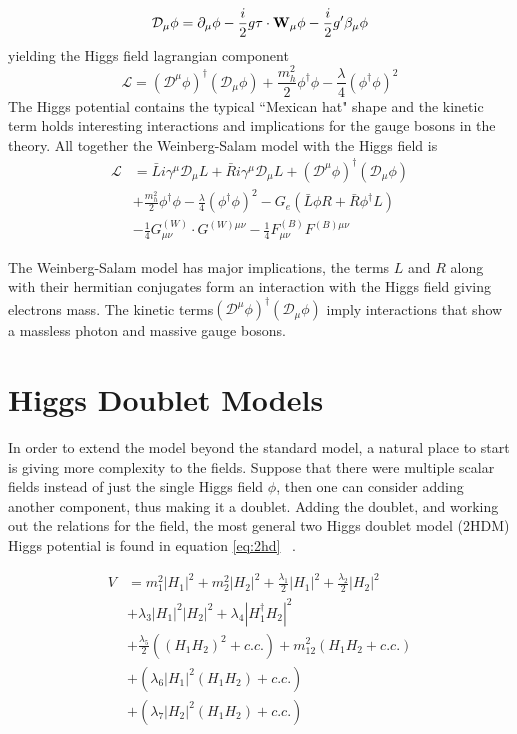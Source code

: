 \[\mathcal{D}_\mu \phi = \partial_\mu \phi - \frac{i}{2}g\bold{\tau}\cdot\bold{W}_\mu \phi - \frac{i}{2}g'\beta_\mu\phi \]
yielding the Higgs field lagrangian component 
\[\mathcal{L} = (\mathcal{D}^\mu \phi)^\dag (\mathcal{D}_\mu \phi) + \frac{m^2_h}{2}\phi^\dag \phi - \frac{\lambda}{4}(\phi^\dag\phi)^2 \] 
The Higgs potential contains the typical ``Mexican hat" shape and the kinetic term holds interesting interactions and implications for the gauge bosons in the theory. 
All together the Weinberg-Salam model with the Higgs field is ~\cite{Lancaster:1629337}
\begin{align}
\label{eq:ws}
\mathcal{L} &= \bar{L}i \gamma^\mu \mathcal{D}_\mu L +\bar{R}i \gamma^\mu \mathcal{D}_\mu L + (\mathcal{D}^\mu \phi)^\dag(\mathcal{D}_\mu\phi)  \\
            &+\frac{m^2_h}{2}\phi^\dag \phi - \frac{\lambda}{4}(\phi^\dag\phi)^2 - G_e(\bar{L}\phi R +\bar{R}\phi^\dag L)\nonumber \\
            &-\frac{1}{4}G^{(W)}_{\mu\nu}\cdot G^{(W)\mu\nu} - \frac{1}{4}F^{(B)}_{\mu\nu} F^{(B)\mu\nu} 
\end{align}

The Weinberg-Salam model has major implications, the terms $L$ and $R$ along with their hermitian conjugates form an interaction with the Higgs field giving electrons mass. The kinetic terms$(\mathcal{D}^\mu \phi)^\dag(\mathcal{D}_\mu\phi)$ imply interactions that show a massless photon and massive gauge bosons.  

\section{Higgs Doublet Models}
In order to extend the model beyond the standard model, a natural place to start is giving more complexity to the fields. Suppose that there were multiple scalar fields instead of just the single Higgs field $\phi$, then one can consider adding another component, thus making it a doublet. Adding the doublet, and working out the relations for the field, the most general two Higgs doublet model (2HDM) Higgs potential is found in equation \ref{eq:2hd} ~\cite{Branco_2012}.

\begin{align} 
\label{eq:2hd}
V &= m^2_1|H_1|^2 + m^2_2|H_2|^2 + \frac{\lambda_1}{2}|H_1|^2 + \frac{\lambda_2}{2}|H_2|^2  \\
    &+\lambda_3|H_1|^2|H_2|^2 + \lambda_4|H^\dag_1 H_2|^2 \nonumber \\
    &+\frac{\lambda_5}{2}\left((H_1H_2)^2 + c.c.\right) +m^2_{12}\left(H_1 H_2 + c.c.\right) \nonumber \\
    &+\left(\lambda_6|H_1|^2(H_1 H_2) + c.c.\right) \nonumber \\
    &+\left(\lambda_7|H_2|^2(H_1 H_2) + c.c.\right) \nonumber 
\end{align}

